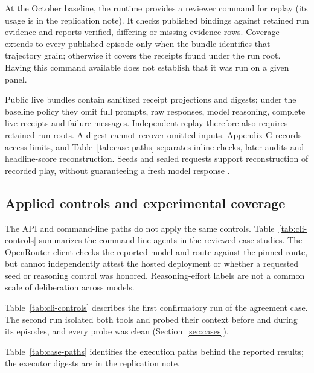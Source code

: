 At the October baseline, the runtime provides a reviewer command for replay (its usage is in the
replication note). It checks published bindings against retained run evidence and reports
verified, differing or missing-evidence rows. Coverage extends to every
published episode only when the bundle identifies that trajectory grain;
otherwise it covers the receipts found under the run root. Having this
command available does not establish that it was run on a given panel.

Public live bundles contain sanitized receipt projections and digests;
under the baseline policy they omit full prompts, raw responses, model reasoning,
complete live receipts and failure messages. Independent replay therefore
also requires retained run roots. A digest cannot recover omitted inputs.
Appendix G records access limits, and Table~\ref{tab:case-paths} separates
inline checks, later audits and headline-score reconstruction. Seeds and
sealed requests support reconstruction of recorded play, without
guaranteeing a fresh model response \citep{he2025nondeterminism}.

\subsection{Applied controls and experimental coverage}
\label{app:runtime-cases}

The API and command-line paths do not apply the same controls. Table~\ref{tab:cli-controls}
summarizes the command-line agents in the reviewed case studies. The OpenRouter
client checks the reported model and route against the pinned
route, but cannot independently attest the hosted deployment or whether a
requested seed or reasoning control was honored. Reasoning-effort labels
are not a common scale of deliberation across models.



Table~\ref{tab:cli-controls} describes the first confirmatory run of the agreement case. The
second run isolated both tools and probed their context before and during its
episodes, and every probe was clean (Section~\ref{sec:cases}).

Table~\ref{tab:case-paths} identifies the execution paths behind the reported
results; the executor digests are in the replication note.



